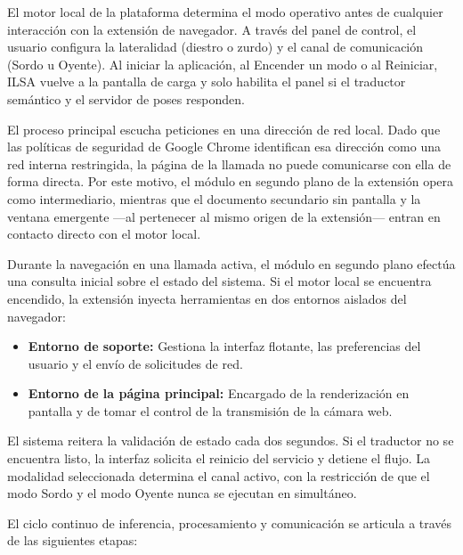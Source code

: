 El motor local de la plataforma determina el modo operativo antes de cualquier interacción con la extensión de navegador. A través del panel de control, el usuario configura la lateralidad (diestro o zurdo) y el canal de comunicación (Sordo u Oyente). Al iniciar la aplicación, al Encender un modo o al Reiniciar, ILSA vuelve a la pantalla de carga y solo habilita el panel si el traductor semántico y el servidor de poses responden.

El proceso principal escucha peticiones en una dirección de red local. Dado que las políticas de seguridad de Google Chrome identifican esa dirección como una red interna restringida, la página de la llamada no puede comunicarse con ella de forma directa. Por este motivo, el módulo en segundo plano de la extensión opera como intermediario, mientras que el documento secundario sin pantalla y la ventana emergente —al pertenecer al mismo origen de la extensión— entran en contacto directo con el motor local.

Durante la navegación en una llamada activa, el módulo en segundo plano efectúa una consulta inicial sobre el estado del sistema. Si el motor local se encuentra encendido, la extensión inyecta herramientas en dos entornos aislados del navegador:
\begin{itemize}
\item \textbf{Entorno de soporte:} Gestiona la interfaz flotante, las preferencias del usuario y el envío de solicitudes de red.
\item \textbf{Entorno de la página principal:} Encargado de la renderización en pantalla y de tomar el control de la transmisión de la cámara web.
\end{itemize}

El sistema reitera la validación de estado cada dos segundos. Si el traductor no se encuentra listo, la interfaz solicita el reinicio del servicio y detiene el flujo. La modalidad seleccionada determina el canal activo, con la restricción de que el modo Sordo y el modo Oyente nunca se ejecutan en simultáneo.

El ciclo continuo de inferencia, procesamiento y comunicación se articula a través de las siguientes etapas:

